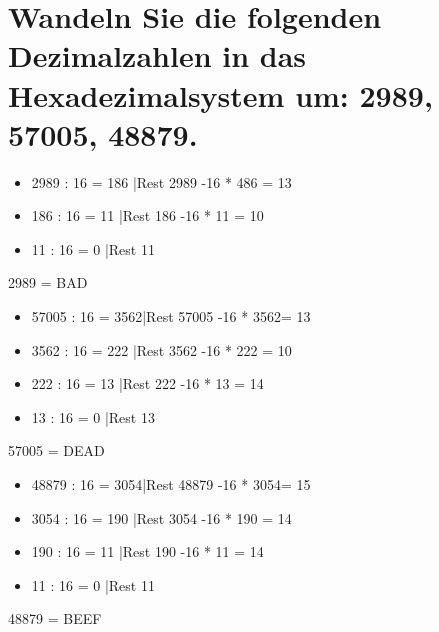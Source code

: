 \section[Dezimalzahlen in Hexadezimalsystem]{Wandeln Sie die folgenden Dezimalzahlen in das Hexadezimalsystem um: 2989, 57005, 48879.}
\begin{itemize}
	\item 2989	:	16	=	186	|Rest	2989	-16	*	486	=	13
	\item 186	:	16	=	11	|Rest	186		-16	*	11	=	10
	\item 11	:	16	=	0	|Rest	11
\end{itemize}
2989	= 	BAD\
\begin{itemize}
	\item 57005	:	16	=	3562|Rest	57005	-16	*	3562=	13
	\item 3562	:	16	=	222	|Rest	3562	-16	*	222	=	10
	\item 222	:	16	=	13	|Rest	222		-16	*	13	=	14
	\item 13	:	16	=	0	|Rest	13
\end{itemize}
57005	=	DEAD\
\begin{itemize}
	\item 48879	:	16	=	3054|Rest	48879	-16	*	3054=	15
	\item 3054	:	16	=	190	|Rest	3054	-16	*	190	=	14
	\item 190	:	16	=	11	|Rest	190		-16	*	11	=	14
	\item 11	:	16	=	0	|Rest	11
\end{itemize}
48879	=	BEEF\